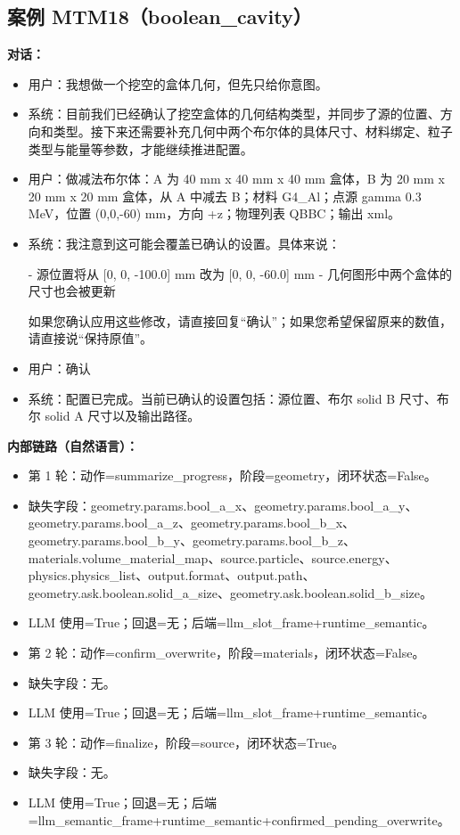 \documentclass[11pt]{ctexart}
\begin{document}
\subsection{案例 MTM18（boolean\_cavity）}
\textbf{对话：}
\begin{itemize}
\item 用户：我想做一个挖空的盒体几何，但先只给你意图。
\item 系统：目前我们已经确认了挖空盒体的几何结构类型，并同步了源的位置、方向和类型。接下来还需要补充几何中两个布尔体的具体尺寸、材料绑定、粒子类型与能量等参数，才能继续推进配置。
\item 用户：做减法布尔体：A 为 40 mm x 40 mm x 40 mm 盒体，B 为 20 mm x 20 mm x 20 mm 盒体，从 A 中减去 B；材料 G4\_Al；点源 gamma 0.3 MeV，位置 (0,0,-60) mm，方向 +z；物理列表 QBBC；输出 xml。
\item 系统：我注意到这可能会覆盖已确认的设置。具体来说：

- 源位置将从 [0, 0, -100.0] mm 改为 [0, 0, -60.0] mm
- 几何图形中两个盒体的尺寸也会被更新

如果您确认应用这些修改，请直接回复“确认”；如果您希望保留原来的数值，请直接说“保持原值”。
\item 用户：确认
\item 系统：配置已完成。当前已确认的设置包括：源位置、布尔 solid B 尺寸、布尔 solid A 尺寸以及输出路径。
\end{itemize}
\textbf{内部链路（自然语言）：}
\begin{itemize}
\item 第 1 轮：动作=summarize\_progress，阶段=geometry，闭环状态=False。
\item 缺失字段：geometry.params.bool\_a\_x、geometry.params.bool\_a\_y、geometry.params.bool\_a\_z、geometry.params.bool\_b\_x、geometry.params.bool\_b\_y、geometry.params.bool\_b\_z、materials.volume\_material\_map、source.particle、source.energy、physics.physics\_list、output.format、output.path、geometry.ask.boolean.solid\_a\_size、geometry.ask.boolean.solid\_b\_size。
\item LLM 使用=True；回退=无；后端=llm\_slot\_frame+runtime\_semantic。
\item 第 2 轮：动作=confirm\_overwrite，阶段=materials，闭环状态=False。
\item 缺失字段：无。
\item LLM 使用=True；回退=无；后端=llm\_slot\_frame+runtime\_semantic。
\item 第 3 轮：动作=finalize，阶段=source，闭环状态=True。
\item 缺失字段：无。
\item LLM 使用=True；回退=无；后端=llm\_semantic\_frame+runtime\_semantic+confirmed\_pending\_overwrite。
\end{itemize}
\end{document}
